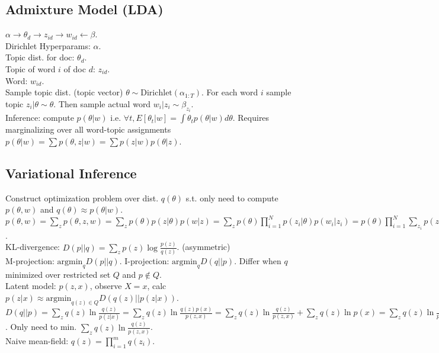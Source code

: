 \subsection*{Admixture Model (LDA)}

$\alpha \rightarrow \theta_d \rightarrow z_{id} \rightarrow w_{id} \leftarrow \beta$.\\
Dirichlet Hyperparams: $\alpha$.\\
Topic dist. for doc: $\theta_d$.\\
Topic of word $i$ of doc $d$: $z_{id}$.\\
Word: $w_{id}$.\\
Sample topic dist. (topic vector) $\theta \sim \text{Dirichlet}(\alpha_{1:T})$. For each word $i$ sample topic $z_i | \theta \sim \theta$. Then sample actual word $w_i | z_i \sim \beta_{z_i}$.\\
Inference: compute $p(\theta|w)$ i.e. $\forall t, E[\theta_t | w] = \int \theta_t p(\theta|w) d\theta$. Requires marginalizing over all word-topic assignments $p(\theta|w) = \sum p(\theta,z|w) = \sum p(z|w)p(\theta|z)$.\\

\subsection*{Variational Inference}

Construct optimization problem over dist. $q(\theta)$ s.t. only need to compute $p(\theta, w)$ and $q(\theta) \approx p(\theta|w)$.\\
$p(\theta, w) = \sum_z p(\theta,z,w) = \sum_z p(\theta) p(z|\theta) p(w|z) = \sum_z p(\theta) \prod_{i=1}^N p(z_i|\theta) p(w_i|z_i) = p(\theta) \prod_{i=1}^N \sum_{z_i} p(z_i|\theta) p(w_i|z_i)$.\\
KL-divergence: $D(p||q) = \sum_z p(z)\log\frac{p(z)}{q(z)}$. (asymmetric)\\
M-projection: $\text{argmin}_q D(p||q)$. I-projection: $\text{argmin}_q D(q||p)$. Differ when $q$ minimized over restricted set $Q$ and $p\not\in Q$.\\
Latent model: $p(z, x)$, observe $X=x$, calc $p(z|x) \approx \text{argmin}_{q(z) \in Q} D(q(z)||p(z|x))$.\\
$D(q||p) = \sum_z q(z)\ln \frac{q(z)}{p(z|x)} = \sum_z q(z)\ln\frac{q(z)p(x)}{p(z,x)} = \sum_z q(z)\ln\frac{q(z)}{p(z,x)}+\sum_z q(z)\ln p(x) = \sum_z q(z)\ln\frac{q(z)}{p(z,x)}+\ln p(x)$. Only need to min. $\sum_z q(z)\ln\frac{q(z)}{p(z,x)}$.\\
Naive mean-field: $q(z) = \prod_{i=1}^m q(z_i)$.

